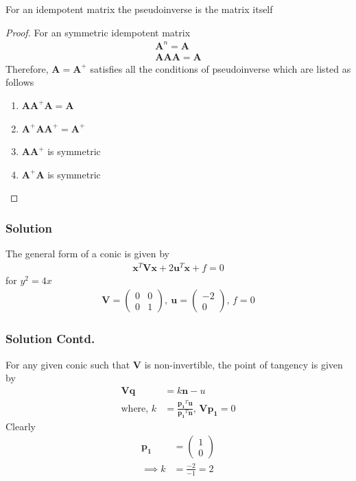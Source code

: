 \documentclass{beamer}
\newcommand{\myvec}[1]{\ensuremath{\begin{pmatrix}#1\end{pmatrix}}}
\renewcommand{\vec}[1]{\boldsymbol{#1}}
\begin{document}
\begin{frame}
    \begin{lemma}
        \label{lemma:pseudoinverse}
            For an idempotent matrix the pseudoinverse is the matrix itself
        \end{lemma}
        \begin{proof}
            For an symmetric idempotent matrix
            \begin{align}
                \vec{A}^n=\vec{A}\\
                \vec{AAA}=\vec{A}
            \end{align}
            Therefore, $\vec{A}=\vec{A}^+$ satisfies all the conditions of pseudoinverse which are listed as follows
        \begin{enumerate}
            \item $\vec{AA}^+\vec{A}=\vec{A}$
            \item $\vec{A}^+\vec{AA}^+=\vec{A}^+$
            \item $\vec{AA}^+$ is symmetric
            \item $\vec{A}^+\vec{A}$ is symmetric
        \end{enumerate}
        \end{proof}
\end{frame}

\begin{frame}
\frametitle{Solution}
The general form of a conic is given by
\begin{align}
    \vec{x}^T\vec{Vx}+2\vec{u}^T\vec{x}+f=0 \label{eq:genConic}
\end{align}
for $y^2=4x$
\begin{align}
\vec{V}=\myvec{0 & 0 \\ 0 & 1},\ \vec{u}=\myvec{-2 \\0},\, f=0
\end{align}
\end{frame}

\begin{frame}
\frametitle{Solution Contd.}
For any given conic such that $\vec{V}$ is non-invertible, the point of tangency is given by
\begin{align}
    \vec{Vq}&=k\vec{n}-u \\
    \text{where},\, k& = \frac{\vec{p_1}^T\vec{u}}{\vec{p_1}^T\vec{n}},\, \vec{Vp_1}=0
\end{align}
Clearly
\begin{align}
    \vec{p_1}& =\myvec{1\\0} \\
    \implies k & =\frac{-2}{-1}=2
\end{align}
\end{frame}
\end{document}
